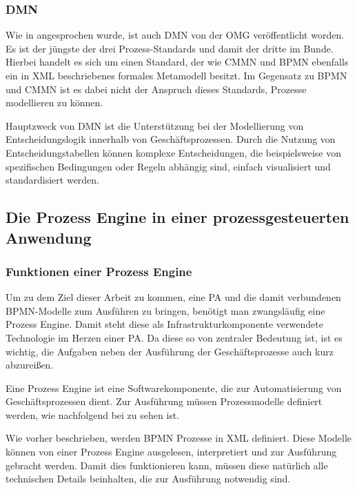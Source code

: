 \subsubsection{\acl{DMN}}

Wie in  angesprochen wurde, ist auch \acl{DMN} von der \ac{OMG} veröffentlicht worden. Es ist der jüngste der drei Prozess-Standards und damit der dritte im Bunde. Hierbei handelt es sich um einen Standard, der wie \ac{CMMN} und \ac{BPMN} ebenfalls ein in XML beschriebenes formales Metamodell besitzt. Im Gegensatz zu \ac{BPMN} und \ac{CMMN} ist es dabei nicht der Anspruch dieses Standards, Prozesse modellieren zu können. \citep[vgl.][S. 10f]{freund_praxishandbuch_2017} 

Hauptzweck von \ac{DMN} ist die Unterstützung bei der Modellierung von Entscheidungslogik innerhalb von Geschäftsprozessen. Durch die Nutzung von Entscheidungstabellen können komplexe Entscheidungen, die beispielsweise von spezifischen Bedingungen oder Regeln abhängig sind, einfach visualisiert und standardisiert werden. \citep[vgl.][]{object_management_group_dmn_2025}

\clearpage
\subsection{Die Prozess Engine in einer prozessgesteuerten Anwendung}
\subsubsection{Funktionen einer Prozess Engine}
Um zu dem Ziel dieser Arbeit zu kommen, eine \acl{PA} und die damit verbundenen \ac{BPMN}-Modelle zum Ausführen zu bringen, benötigt man zwangsläufig eine Prozess Engine. Damit steht diese als Infrastrukturkomponente verwendete Technologie im Herzen einer \acl{PA}. Da diese so von zentraler Bedeutung ist, ist es wichtig, die Aufgaben neben der Ausführung der Geschäftsprozesse auch kurz abzureißen. \citep[vgl.][]{stiehl_prozessgesteuerte_2024}

Eine Prozess Engine ist eine Softwarekomponente, die zur Automatisierung von Geschäftsprozessen dient. Zur Ausführung müssen Prozessmodelle definiert werden, wie nachfolgend bei  zu sehen ist. \citep[vgl.][]{leymann_definition_2024}

Wie vorher beschrieben, werden \ac{BPMN} Prozesse in \ac{XML} definiert. Diese Modelle können von einer Prozess Engine ausgelesen, interpretiert und zur Ausführung gebracht werden. Damit dies funktionieren kann, müssen diese natürlich alle technischen Details beinhalten, die zur Ausführung notwendig sind. \citep[vgl.][S. 226]{freund_praxishandbuch_2017}

